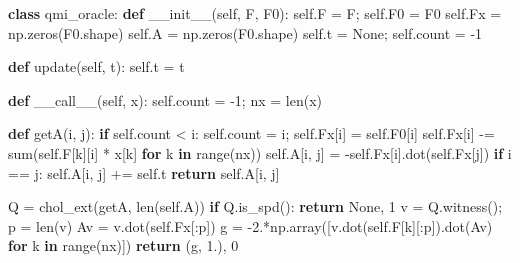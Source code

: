 \documentclass[]{article}
\newenvironment{Shaded}{}{}
\newcommand{\BuiltInTok}[1]{#1}
\newcommand{\ControlFlowTok}[1]{\textcolor[rgb]{0.00,0.44,0.13}{\textbf{#1}}}
\newcommand{\DecValTok}[1]{\textcolor[rgb]{0.25,0.63,0.44}{#1}}
\newcommand{\FloatTok}[1]{\textcolor[rgb]{0.25,0.63,0.44}{#1}}
\newcommand{\FunctionTok}[1]{\textcolor[rgb]{0.02,0.16,0.49}{#1}}
\newcommand{\KeywordTok}[1]{\textcolor[rgb]{0.00,0.44,0.13}{\textbf{#1}}}
\newcommand{\NormalTok}[1]{#1}
\newcommand{\OperatorTok}[1]{\textcolor[rgb]{0.40,0.40,0.40}{#1}}
\newcommand{\VariableTok}[1]{\textcolor[rgb]{0.10,0.09,0.49}{#1}}
\begin{document}
\begin{Shaded}
\begin{Highlighting}[]
\KeywordTok{class}\NormalTok{ qmi_oracle:}
    \KeywordTok{def} \FunctionTok{__init__}\NormalTok{(}\VariableTok{self}\NormalTok{, F, F0):}
        \VariableTok{self}\NormalTok{.F }\OperatorTok{=}\NormalTok{ F}\OperatorTok{;} \VariableTok{self}\NormalTok{.F0 }\OperatorTok{=}\NormalTok{ F0}
        \VariableTok{self}\NormalTok{.Fx }\OperatorTok{=}\NormalTok{ np.zeros(F0.shape)}
        \VariableTok{self}\NormalTok{.A }\OperatorTok{=}\NormalTok{ np.zeros(F0.shape)}
        \VariableTok{self}\NormalTok{.t }\OperatorTok{=} \VariableTok{None}\OperatorTok{;} \VariableTok{self}\NormalTok{.count }\OperatorTok{=} \DecValTok{-1}

    \KeywordTok{def}\NormalTok{ update(}\VariableTok{self}\NormalTok{, t): }\VariableTok{self}\NormalTok{.t }\OperatorTok{=}\NormalTok{ t}

    \KeywordTok{def} \FunctionTok{__call__}\NormalTok{(}\VariableTok{self}\NormalTok{, x):}
        \VariableTok{self}\NormalTok{.count }\OperatorTok{=} \DecValTok{-1}\OperatorTok{;}\NormalTok{ nx }\OperatorTok{=} \BuiltInTok{len}\NormalTok{(x)}

        \KeywordTok{def}\NormalTok{ getA(i, j):}
            \ControlFlowTok{if} \VariableTok{self}\NormalTok{.count }\OperatorTok{<}\NormalTok{ i:}
                \VariableTok{self}\NormalTok{.count }\OperatorTok{=}\NormalTok{ i}\OperatorTok{;} \VariableTok{self}\NormalTok{.Fx[i] }\OperatorTok{=} \VariableTok{self}\NormalTok{.F0[i]}
                \VariableTok{self}\NormalTok{.Fx[i] }\OperatorTok{-=} \BuiltInTok{sum}\NormalTok{(}\VariableTok{self}\NormalTok{.F[k][i] }\OperatorTok{*}\NormalTok{ x[k]}
                                  \ControlFlowTok{for}\NormalTok{ k }\KeywordTok{in} \BuiltInTok{range}\NormalTok{(nx))}
            \VariableTok{self}\NormalTok{.A[i, j] }\OperatorTok{=} \OperatorTok{-}\VariableTok{self}\NormalTok{.Fx[i].dot(}\VariableTok{self}\NormalTok{.Fx[j])}
            \ControlFlowTok{if}\NormalTok{ i }\OperatorTok{==}\NormalTok{ j: }\VariableTok{self}\NormalTok{.A[i, j] }\OperatorTok{+=} \VariableTok{self}\NormalTok{.t}
            \ControlFlowTok{return} \VariableTok{self}\NormalTok{.A[i, j]}

\NormalTok{        Q }\OperatorTok{=}\NormalTok{ chol_ext(getA, }\BuiltInTok{len}\NormalTok{(}\VariableTok{self}\NormalTok{.A))}
        \ControlFlowTok{if}\NormalTok{ Q.is_spd(): }\ControlFlowTok{return} \VariableTok{None}\NormalTok{, }\DecValTok{1}
\NormalTok{        v }\OperatorTok{=}\NormalTok{ Q.witness()}\OperatorTok{;}\NormalTok{ p }\OperatorTok{=} \BuiltInTok{len}\NormalTok{(v)}
\NormalTok{        Av }\OperatorTok{=}\NormalTok{ v.dot(}\VariableTok{self}\NormalTok{.Fx[:p])}
\NormalTok{        g }\OperatorTok{=} \FloatTok{-2.}\OperatorTok{*}\NormalTok{np.array([v.dot(}\VariableTok{self}\NormalTok{.F[k][:p]).dot(Av)}
                          \ControlFlowTok{for}\NormalTok{ k }\KeywordTok{in} \BuiltInTok{range}\NormalTok{(nx)])}
        \ControlFlowTok{return}\NormalTok{ (g, }\FloatTok{1.}\NormalTok{), }\DecValTok{0}
\end{Highlighting}
\end{Shaded}
\end{document}
